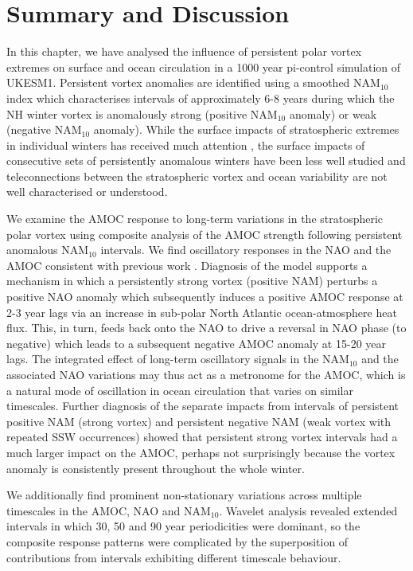 \section{Summary and Discussion}
In this chapter, we have analysed the influence of persistent polar vortex extremes on surface and ocean circulation in a 1000 year pi-control simulation of UKESM1. Persistent vortex anomalies are identified using a smoothed NAM$_{10}$ index which characterises intervals of approximately 6-8 years during which the NH winter vortex is anomalously strong (positive NAM$_{10}$ anomaly) or weak (negative NAM$_{10}$ anomaly). While the surface impacts of stratospheric extremes in individual winters has received much attention \citep{baldwinStratospheric2001a, domeisenEstimating2019d, charlton-perezInfluence2018e}, the surface impacts of consecutive sets of persistently anomalous winters have been less well studied and teleconnections between the stratospheric vortex and ocean variability are not well characterised or understood. 

We examine the AMOC response to long-term variations in the stratospheric polar vortex using composite analysis of the AMOC strength following persistent anomalous NAM$_{10}$ intervals. We find oscillatory responses in the NAO and the AMOC consistent with previous work \citep{reichlerStratospheric2012b}. Diagnosis of the model supports a mechanism in which a persistently strong vortex (positive NAM) perturbs a positive NAO anomaly which subsequently induces a positive AMOC response at 2-3 year lags via an increase in sub-polar North Atlantic ocean-atmosphere heat flux. This, in turn, feeds back onto the NAO to drive a reversal in  NAO phase (to negative) which leads to a subsequent negative AMOC anomaly at 15-20 year lags. The integrated effect of long-term oscillatory signals in the NAM$_{10}$ and the associated NAO variations may thus act as a metronome for the AMOC, which is a natural mode of oscillation in  ocean circulation that varies on similar timescales. Further diagnosis of the separate impacts from  intervals of persistent positive NAM (strong vortex) and persistent negative NAM (weak vortex with repeated SSW occurrences) showed that persistent strong vortex intervals had a much larger impact on the AMOC, perhaps not surprisingly because the vortex anomaly is consistently present throughout the whole winter.

We additionally find prominent non-stationary variations across multiple timescales in the AMOC, NAO and NAM$_{10}$. Wavelet analysis revealed extended intervals in  which 30, 50 and 90 year periodicities were dominant, so the composite response patterns were complicated by  the superposition of contributions from intervals exhibiting different timescale behaviour. 

